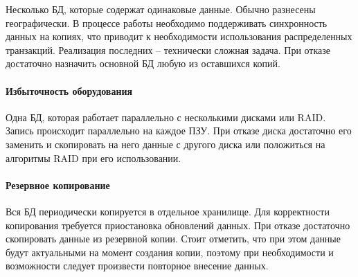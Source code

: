 Несколько БД, которые содержат одинаковые данные. Обычно разнесены географически. В процессе работы
необходимо поддерживать синхронность данных на копиях, что приводит к необходимости использования
распределенных транзакций. Реализация последних -- технически сложная задача. При отказе достаточно
назначить основной БД любую из оставшихся копий.

\paragraph{Избыточность оборудования}

Одна БД, которая работает параллельно с несколькими дисками или RAID. Запись происходит параллельно
на каждое ПЗУ. При отказе диска достаточно его заменить и скопировать на него данные с другого
диска или положиться на алгоритмы RAID при его использовании.

\paragraph{Резервное копирование}

Вся БД периодически копируется в отдельное хранилище. Для корректности копирования требуется
приостановка обновлений данных. При отказе достаточно скопировать данные из резервной копии. Стоит
отметить, что при этом данные будут актуальными на момент создания копии, поэтому при необходимости
и возможности следует произвести повторное внесение данных.